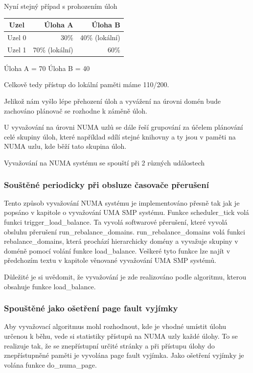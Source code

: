 \documentclass[a4paper,12pt]{article}
\begin{document}
Nyní stejný případ s prohozením úloh

\begin{table}
\centering

\begin{tabular}{|c|r|r|}
\hline
Uzel & Úloha A & Úloha B \\
\hline
Uzel 0 & 30\% & 40\% (lokální)\\
\hline
Uzel 1 & 70\% (lokální) & 60\% \\
\hline
\end{tabular}
\end{table}

Úloha A = 70
Úloha B = 40

Celkově tedy přístup do lokální paměti máme 110/200.

Jelikož nám vyšlo lépe přehození úloh a vyvážení na úrovni domén bude zachováno plánovač se rozhodne k záměně úloh. 

U vyvažování na úrovni NUMA uzlů se dále řeší grupování za účelem plánování celé skupiny úloh, které například sdílí stejné knihovny a ty jsou v paměti na NUMA uzlu, kde běží tato skupina úloh. 


	Vyvažování na NUMA systému se spouští při 2 různých událostech

\subsubsection*{Souštěné periodicky při obsluze časovače přerušení}
Tento způsob vyvažování NUMA systému je implementováno přesně tak jak je popsáno v kapitole o vyvažování UMA SMP systému. Funkce scheduler\_tick volá funkci trigger\_load\_balance. Ta vyvolá softwarové přerušení, které vyvolá obsluhu přerušení run\_rebalance\_domains. run\_rebalance\_domains volá funkci rebalance\_domains, která prochází hierarchicky domény a vyvažuje skupiny v doméně pomocí volání funkce load\_balance. Veškeré tyto funkce lze najít v předchozím textu v kapitole věnované vyvažování UMA SMP systémů. 

Důležité je si uvědomit, že vyvažování je zde realizováno podle algoritmu, kterou obsahuje funkce load\_balance.

\subsubsection*{Spouštěné jako ošetření page fault vyjímky}
Aby vyvažovací algoritmus mohl rozhodnout, kde je vhodné umístit úlohu určenou k běhu, vede si statistiky přístupů na NUMA uzly každé úlohy. To se realizuje tak, že se znepřístupní určité stránky a při přístupu úlohy do znepřístupněné paměti je vyvolána page fault vyjímka. Jako ošetření vyjímky je volána funkce do\_numa\_page. 
\end{document}
